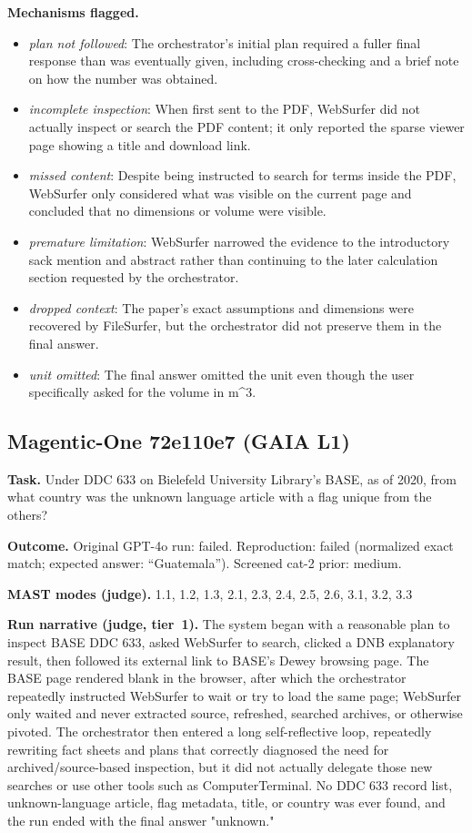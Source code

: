 \textbf{Mechanisms flagged.}
\begin{itemize}
  \item \emph{plan not followed}: The orchestrator's initial plan required a fuller final response than was eventually given, including cross-checking and a brief note on how the number was obtained.
  \item \emph{incomplete inspection}: When first sent to the PDF, WebSurfer did not actually inspect or search the PDF content; it only reported the sparse viewer page showing a title and download link.
  \item \emph{missed content}: Despite being instructed to search for terms inside the PDF, WebSurfer only considered what was visible on the current page and concluded that no dimensions or volume were visible.
  \item \emph{premature limitation}: WebSurfer narrowed the evidence to the introductory sack mention and abstract rather than continuing to the later calculation section requested by the orchestrator.
  \item \emph{dropped context}: The paper's exact assumptions and dimensions were recovered by FileSurfer, but the orchestrator did not preserve them in the final answer.
  \item \emph{unit omitted}: The final answer omitted the unit even though the user specifically asked for the volume in m\textasciicircum{}3.
\end{itemize}

\subsection*{Magentic-One 72e110e7 (GAIA L1)}
\textbf{Task.} Under DDC 633 on Bielefeld University Library's BASE, as of 2020, from what country was the unknown language article with a flag unique from the others?

\textbf{Outcome.} Original GPT-4o run: failed. Reproduction: failed (normalized exact match; expected answer: ``Guatemala''). Screened cat-2 prior: medium.

\textbf{MAST modes (judge).} 1.1, 1.2, 1.3, 2.1, 2.3, 2.4, 2.5, 2.6, 3.1, 3.2, 3.3

\textbf{Run narrative (judge, tier~1).} The system began with a reasonable plan to inspect BASE DDC 633, asked WebSurfer to search, clicked a DNB explanatory result, then followed its external link to BASE's Dewey browsing page. The BASE page rendered blank in the browser, after which the orchestrator repeatedly instructed WebSurfer to wait or try to load the same page; WebSurfer only waited and never extracted source, refreshed, searched archives, or otherwise pivoted. The orchestrator then entered a long self-reflective loop, repeatedly rewriting fact sheets and plans that correctly diagnosed the need for archived/source-based inspection, but it did not actually delegate those new searches or use other tools such as ComputerTerminal. No DDC 633 record list, unknown-language article, flag metadata, title, or country was ever found, and the run ended with the final answer "unknown."

